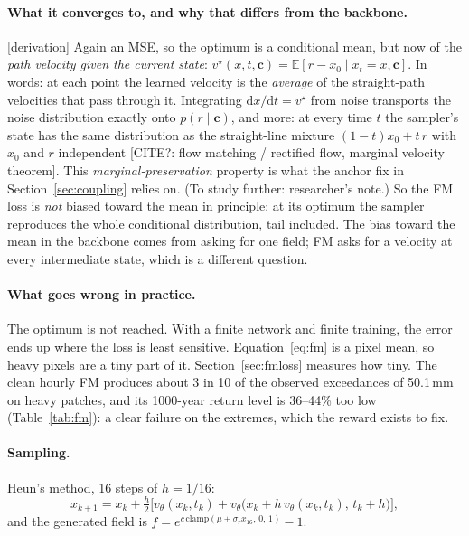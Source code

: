 \documentclass[11pt,a4paper]{article}
\newcommand{\E}{\mathbb{E}}
\newcommand{\citeq}[1]{\textcolor{red!70!black}{[CITE?: #1]}}
\newcommand{\status}[1]{\textsf{\small[#1]}}
\begin{document}
\paragraph{What it converges to, and why that differs from the backbone.} \status{derivation} Again an MSE, so the
optimum is a conditional mean, but now of the \emph{path velocity given the current state}:
$v^\star(x,t,\mathbf c) = \E[r - x_0\mid x_t = x,\mathbf c]$. In words: at each point the learned velocity is the \emph{average} of the straight-path velocities that pass through
it. Integrating $\mathrm dx/\mathrm dt = v^\star$ from noise transports the noise distribution exactly onto
$p(r\mid\mathbf c)$, and more: at every time $t$ the sampler's state has the same distribution as the straight-line
mixture $(1-t)x_0 + t\,r$ with $x_0$ and $r$ independent \citeq{flow matching / rectified flow, marginal velocity
theorem}. This \emph{marginal-preservation} property is what the anchor fix in Section~\ref{sec:coupling} relies on.
(To study further: researcher's note.) So the FM loss is \emph{not} biased toward the mean in principle: at its optimum the sampler
reproduces the whole conditional distribution, tail included. The bias toward the mean in the backbone comes from
asking for one field; FM asks for a velocity at every intermediate state, which is a different question.

\paragraph{What goes wrong in practice.} The optimum is not reached. With a finite network and finite training, the
error ends up where the loss is least sensitive. Equation~\eqref{eq:fm} is a pixel mean, so heavy pixels are a
tiny part of it. Section~\ref{sec:fmloss} measures how tiny. The clean hourly FM produces about 3 in 10 of the observed
exceedances of 50.1\,mm on heavy patches, and its 1000-year return level is 36--44\% too low (Table~\ref{tab:fm}): a
clear failure on the extremes, which the reward exists to fix.

\paragraph{Sampling.} Heun's method, 16 steps of $h = 1/16$:
\begin{equation}\label{eq:heun}
  x_{k+1} = x_k + \tfrac h2\Big[v_\theta(x_k,t_k) + v_\theta\big(x_k + h\,v_\theta(x_k,t_k),\,t_k+h\big)\Big],
\end{equation}
and the generated field is $f = e^{c\,\mathrm{clamp}(\mu + \sigma_r x_{16},\,0,\,1)}-1$.
\end{document}
